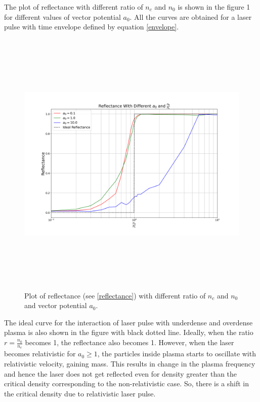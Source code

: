 \documentclass[]{article}
\begin{document}
The plot of reflectance with different ratio of $n_c$ and $n_0$ is shown in the figure 1 for different values of vector potential $a_0$. All the curves are obtained for a laser pulse with time envelope defined by equation \ref{envelope}.
\begin{figure}
    \label{reflectance_fig}
    \includegraphics[width=16cm, height=13cm]{reflection.png}
    \centering
    \caption{Plot of reflectance (see \ref{reflectance}) with different ratio of $n_c$ and $n_0$ and vector potential $a_0$.}

\end{figure}
The ideal curve for the interaction of laser pulse with underdense and overdense plasma is also shown in the figure with black dotted line. Ideally, when the ratio $r = \frac{n_0}{n_c}$ becomes 1, the reflectance also becomes 1. However, when the laser becomes relativistic for $a_0 \ge 1$, the particles inside plasma starts to oscillate with relativistic velocity, gaining mass. This results in change in the plasma frequency and hence the laser does not get reflected even for density greater than the critical density corresponding to the non-relativistic case. So, there is a shift in the critical density due to relativistic laser pulse.
\end{document}
